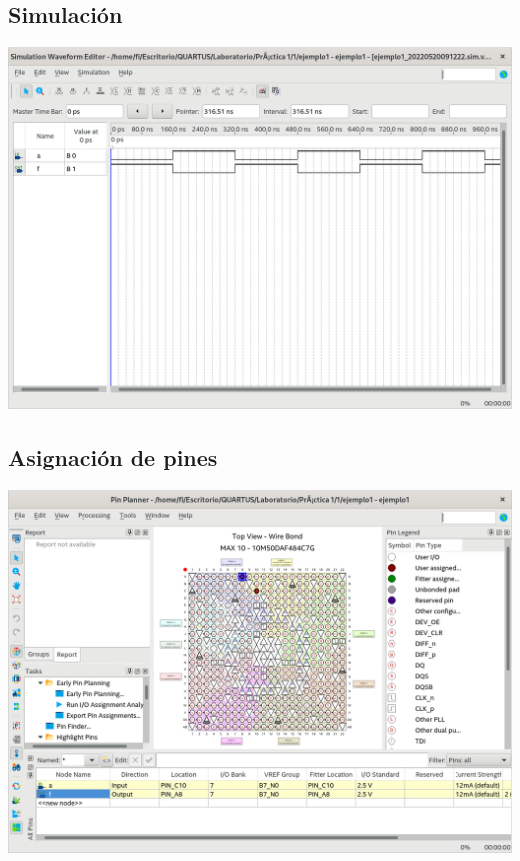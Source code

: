 \documentclass[10pt,a4paper]{article}
\begin{document}
	\subsection{Simulación}
	\begin{center}
		\includegraphics[scale=0.35]{Simulacion1.png}
	\end{center}

	\subsection{Asignación de pines}
	\begin{center}
		\includegraphics[scale=0.35]{Pines1.png}
	\end{center}
\end{document}
